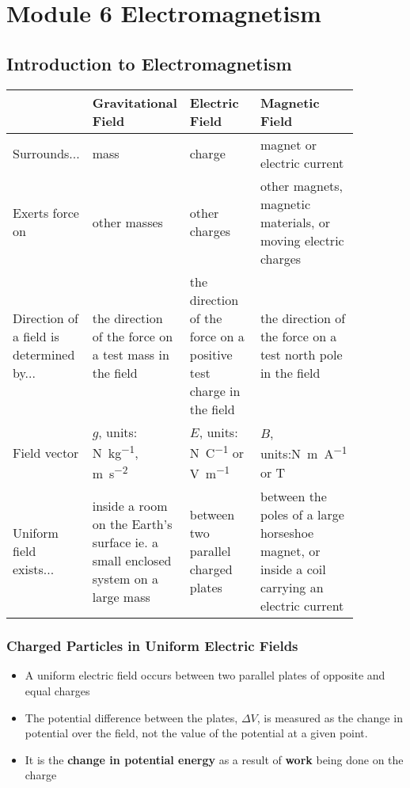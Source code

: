 \chapter{Module 6 \hspace{0.5em} Electromagnetism}

\section{Introduction to Electromagnetism} \label{07/02/25}
	\def\arraystretch{1.5}
	\begin{table}[htbp]
		\centering
		\begin{tabular}{p{0.15\linewidth}|p{0.24\linewidth}|p{0.24\linewidth}|p{0.24\linewidth}}
			\hline
			 & Gravitational Field & Electric Field & Magnetic Field \\ \hline
			Surrounds... & mass & charge & magnet or electric current \\
			Exerts force on & other masses & other charges & other magnets, magnetic materials, or moving electric charges \\
			Direction of a field is determined by... & the direction of the force on a test mass in the field & the direction of the force on a positive test charge in the field & the direction of the force on a test north pole in the field \\
			Field vector & $g$, units: \si{\newton\per\kilogram}, \si{\metre\per\second\squared} & $E$, units: \si{\newton\per\coulomb} or \si{\volt\per\meter} & $B$, units:\si{\newton\metre\per\ampere} or \si{\tesla} \\
			Uniform field exists... & inside a room on the Earth's surface ie. a small enclosed system on a large mass & between two parallel charged plates & between the poles of a large horseshoe magnet, or inside a coil carrying an electric current \\ \hline
		\end{tabular}
	\end{table}

	\subsection{Charged Particles in Uniform Electric Fields}
		\begin{itemize}
			\item A uniform electric field occurs between two parallel plates of opposite and equal charges
			\item The potential difference between the plates, $\Delta V$, is measured as the change in potential over the field, not the value of the potential at a given point.
			\item It is the \textbf{change in potential energy} as a result of \textbf{work} being done on the charge
		\end{itemize}

